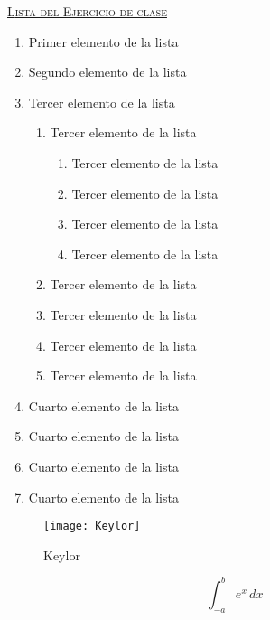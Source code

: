 \documentclass[10pt,a4paper]{article}
\begin{document}
\underline{\lettrine{L}{ista del Ejercicio de clase}} \\

\begin{enumerate}
  \item Primer elemento de la lista
  \item Segundo elemento de la lista
  \item Tercer elemento de la lista
  \begin{enumerate}
   \item Tercer elemento de la lista
   \begin{enumerate}
      \item Tercer elemento de la lista
      \item Tercer elemento de la lista
      \item Tercer elemento de la lista
      \item Tercer elemento de la lista
   \end{enumerate}
  \item Tercer elemento de la lista
   \item Tercer elemento de la lista
    \item Tercer elemento de la lista
     \item Tercer elemento de la lista
  \end{enumerate}
  \item Cuarto elemento de la lista
  \item Cuarto elemento de la lista
  \item Cuarto elemento de la lista
  \item Cuarto elemento de la lista
\end{enumerate}  

\begin{figure}[hb]
\centering
\texttt{[image: Keylor]}
\caption{Keylor}
\end{figure}

\begin{equation}
\int_{-a}^{b} e^x\, dx 
\end{equation}
\end{document}
